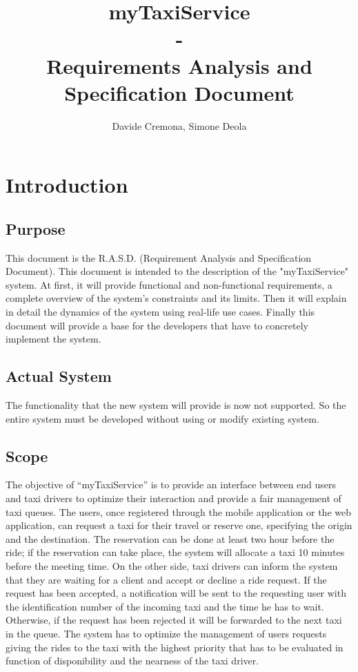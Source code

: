 \documentclass{report}
\begin{document}
\title{myTaxiService \\ -  \\ Requirements Analysis and Specification Document}
\author{Davide Cremona, Simone Deola}
\maketitle

\tableofcontents

\chapter{Introduction}
\section{Purpose}
This document is the R.A.S.D. (Requirement Analysis and Specification Document).
This document is intended to the description of the "myTaxiService" system. 
At first, it will provide functional and non-functional requirements, a complete overview of the system's constraints and its limits. Then it will explain in detail the dynamics of the system using real-life use cases.
Finally this document will provide a base for the developers that have to concretely implement the system.

\section{Actual System}
The functionality that the new system will provide is now not supported. 
So the entire system must be developed without using or modify existing system.

\section{Scope}
The objective of “myTaxiService” is to provide an interface between end users and taxi drivers to optimize their interaction and provide a fair management of taxi queues. The users, once registered through the mobile application or the web application, can request a taxi for their travel or reserve one, specifying the origin and the destination. The reservation can be done at least two hour before the ride; if the reservation can take place, the system will allocate a taxi 10 minutes before the meeting time.
On the other side, taxi drivers can inform the system that they are waiting for a client and accept or decline a ride request. If the request has been accepted, a notification will be sent to the requesting user with the identification number of the incoming taxi and the time he has to wait. Otherwise, if the request has been rejected it will be forwarded to the next taxi in the queue.
The system has to optimize the management of users requests giving the rides to the taxi with the highest priority that has to be evaluated in function of disponibility and the nearness of the taxi driver.
\end{document}
